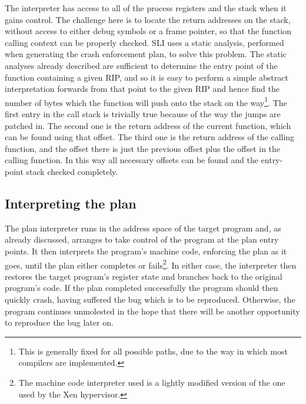 
\label{sect:using:find_return_address}
The interpreter has access to all of the process registers and the
stack when it gains control.  The challenge here is to locate the
return addresses on the stack, without access to either debug symbols
or a frame pointer, so that the function calling context can be
properly checked.  SLI uses a static analysis, performed when
generating the crash enforcement plan, to solve this problem.  The
static analyses already described are sufficient to determine the
entry point of the function containing a given RIP, and so it is easy
to perform a simple abstract interpretation forwards from that point
to the given RIP and hence find the number of bytes which the function
will push onto the stack on the way\footnote{This is generally fixed
  for all possible paths, due to the way in which most compilers are
  implemented.}.  The first entry in the call stack is trivially true
because of the way the jumps are patched in.  The second one is the
return address of the current function, which can be found using that
offset.  The third one is the return address of the calling function,
and the offset there is just the previous offset plus the offset in
the calling function.  In this way all necessary offsets can be found
and the entry-point stack checked completely.


\subsection{Interpreting the plan}
\label{sect:enforce:interpreting}


The plan interpreter runs in the address space of the target program
and, as already discussed, arranges to take control of the program at
the plan entry points.  It then interprets the program's machine code,
enforcing the plan as it goes, until the plan either completes or
fails\footnote{The machine code interpreter used is a lightly modified
  version of the one used by the Xen hypervisor\needCite{}.}.  In
either case, the interpreter then restores the target program's
register state and branches back to the original program's code.  If
the plan completed successfully the program should then quickly crash,
having suffered the bug which is to be reproduced.  Otherwise, the
program continues unmolested in the hope that there will be another
opportunity to reproduce the bug later on.


